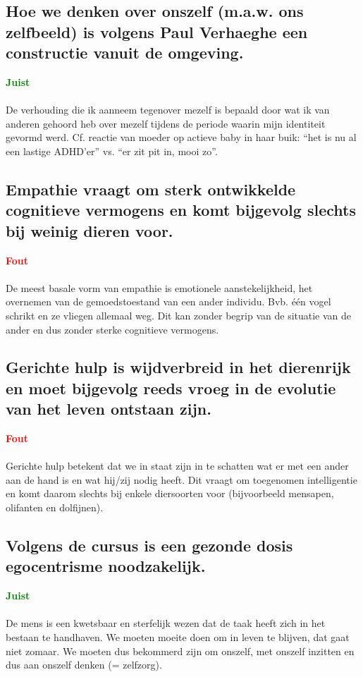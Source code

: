 \documentclass[11pt,a4paper,titlepage]{article}
\begin{document}
\subsection{Hoe we denken over onszelf (m.a.w. ons zelfbeeld) is volgens Paul Verhaeghe een constructie vanuit de omgeving.}
\textcolor{green}{\textbf{Juist}}\\\\
De verhouding die ik aanneem tegenover mezelf is bepaald door wat ik van anderen gehoord heb over mezelf tijdens de periode waarin mijn identiteit gevormd werd. Cf. reactie van moeder op actieve baby in haar buik: “het is nu al een lastige ADHD’er” vs. “er zit pit in, mooi zo”.
\subsection{Empathie vraagt om sterk ontwikkelde cognitieve vermogens en komt bijgevolg slechts bij weinig dieren voor.}
\textcolor{red}{\textbf{Fout}}\\\\
De meest basale vorm van empathie is emotionele aanstekelijkheid, het overnemen van de gemoedstoestand van een ander individu. Bvb. één vogel schrikt en ze vliegen allemaal weg. Dit kan zonder begrip van de situatie van de ander en dus zonder sterke cognitieve vermogens.

\subsection{Gerichte hulp is wijdverbreid in het dierenrijk en moet bijgevolg reeds vroeg in de evolutie van het leven ontstaan zijn.}
\textcolor{red}{\textbf{Fout}}\\\\
Gerichte hulp betekent dat we in staat zijn in te schatten wat er met een ander aan de hand is en wat hij/zij nodig heeft. Dit vraagt om toegenomen intelligentie en komt daarom slechts bij enkele diersoorten voor (bijvoorbeeld mensapen, olifanten en dolfijnen).

\subsection{Volgens de cursus is een gezonde dosis egocentrisme noodzakelijk.}
\textcolor{green}{\textbf{Juist}}\\\\
De mens is een kwetsbaar en sterfelijk wezen dat de taak heeft zich in het bestaan te handhaven. We moeten moeite doen om in leven te blijven, dat gaat niet zomaar. We moeten dus bekommerd zijn om onszelf, met onszelf inzitten en dus aan onszelf denken (= zelfzorg).
\end{document}
